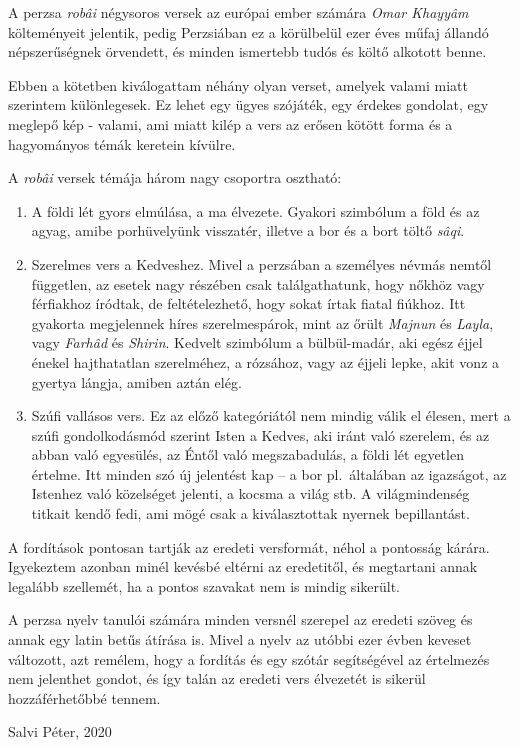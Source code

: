 A perzsa \emph{robâi} négysoros versek az európai ember számára \emph{Omar
Khayyâm} költeményeit jelentik, pedig Perzsiában ez a körülbelül ezer
éves műfaj állandó népszerűségnek örvendett, és minden ismertebb tudós
és költő alkotott benne.

Ebben a kötetben kiválogattam néhány olyan verset, amelyek valami
miatt szerintem különlegesek. Ez lehet egy ügyes szójáték, egy érdekes
gondolat, egy meglepő kép - valami, ami miatt kilép a vers az erősen
kötött forma és a hagyományos témák keretein kívülre.

A \emph{robâi} versek témája három nagy csoportra osztható:

\begin{enumerate}
\item A földi lét gyors elmúlása, a ma élvezete. Gyakori
  szimbólum a föld és az agyag, amibe porhüvelyünk visszatér, illetve
  a bor és a bort töltő \emph{sâqi}.
\item Szerelmes vers a Kedveshez. Mivel a perzsában a személyes névmás
  nemtől független, az esetek nagy részében csak találgathatunk, hogy
  nőkhöz vagy férfiakhoz íródtak, de feltételezhető, hogy sokat írtak
  fiatal fiúkhoz. Itt gyakorta megjelennek híres szerelmespárok, mint
  az őrült \emph{Majnun} és \emph{Layla}, vagy \emph{Farhâd} és
  \emph{Shirin}. Kedvelt szimbólum a bülbül-madár, aki egész éjjel
  énekel hajthatatlan szerelméhez, a rózsához, vagy az éjjeli lepke,
  akit vonz a gyertya lángja, amiben aztán elég.
\item Szúfi vallásos vers. Ez az előző kategóriától nem mindig válik
  el élesen, mert a szúfi gondolkodásmód szerint Isten a Kedves,
  aki iránt való szerelem, és az abban való egyesülés, az Éntől való
  megszabadulás, a földi lét egyetlen értelme. Itt minden szó új
  jelentést kap -- a bor pl.~általában az igazságot, az Istenhez való
  közelséget jelenti, a kocsma a világ stb. A világmindenség titkait
  kendő fedi, ami mögé csak a kiválasztottak nyernek bepillantást.
\end{enumerate}

A fordítások pontosan tartják az eredeti versformát, néhol a pontosság
kárára. Igyekeztem azonban minél kevésbé eltérni az eredetitől, és
megtartani annak legalább szellemét, ha a pontos szavakat nem is
mindig sikerült.

A perzsa nyelv tanulói számára minden versnél szerepel az eredeti
szöveg és annak egy latin betűs átírása is. Mivel a nyelv az utóbbi
ezer évben keveset változott, azt remélem, hogy a fordítás és egy
szótár segítségével az értelmezés nem jelenthet gondot, és így talán
az eredeti vers élvezetét is sikerül hozzáférhetőbbé tennem.

\begin{flushright}
  Salvi Péter, 2020
\end{flushright}
